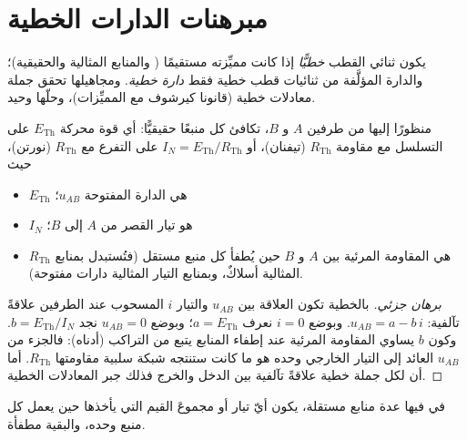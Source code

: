 \section{مبرهنات الدارات الخطية}

\begin{definition}\label{def:b1:dc-circuits:linear}
يكون ثنائي القطب \emph{خطيًّا} إذا كانت مميِّزته مستقيمًا
( والمنابع المثالية والحقيقية)؛ والدارة المؤلَّفة من ثنائيات قطب
خطية فقط \emph{دارة خطية}. ومجاهيلها تحقق جملة معادلات
خطية (قانونا كيرشوف مع المميِّزات)، وحلّها
وحيد.
\end{definition}

\begin{theorem}\label{thm:b1:dc-circuits:thevenin}
منظورًا إليها من طرفين $A$ و $B$، تكافئ كل 
منبعًا حقيقيًّا: أي قوة محركة $E_{\mathrm{Th}}$ على التسلسل مع
مقاومة $R_{\mathrm{Th}}$ (تيفنان)، أو  $I_N =
E_{\mathrm{Th}}/R_{\mathrm{Th}}$ على التفرع مع $R_{\mathrm{Th}}$
(نورتن)، حيث
\begin{itemize}
  \item $E_{\mathrm{Th}}$ هي  الدارة المفتوحة $u_{AB}$؛
  \item $I_N$ هو تيار القصر من $A$ إلى $B$؛
  \item $R_{\mathrm{Th}}$ هي المقاومة المرئية بين $A$ و $B$
        حين يُطفأ كل منبع مستقل (فتُستبدل بمنابع 
        المثالية أسلاكٌ، وبمنابع التيار المثالية دارات
        مفتوحة).
\end{itemize}
\end{theorem}

\begin{proof}[برهان جزئي]
بالخطية تكون العلاقة بين  $u_{AB}$ والتيار
$i$ المسحوب عند الطرفين علاقةً تآلفية: $u_{AB} = a - b\,i$. وبوضع
$i = 0$ نعرف $a = E_{\mathrm{Th}}$؛ وبوضع $u_{AB} = 0$ نجد
$b = E_{\mathrm{Th}}/I_N$. وكون $b$ يساوي المقاومة المرئية عند إطفاء
المنابع يتبع من التراكب (أدناه): فالجزء من $u_{AB}$
العائد إلى التيار الخارجي وحده هو ما كانت ستنتجه شبكة سلبية
مقاومتها $R_{\mathrm{Th}}$. أما أن لكل جملة خطية علاقةً
تآلفية بين الدخل والخرج فذلك جبر المعادلات الخطية.
\end{proof}

\begin{theorem}[التراكب]\label{thm:b1:dc-circuits:superposition}
في  فيها عدة منابع مستقلة، يكون أيّ تيار أو
 مجموعَ القيم التي يأخذها حين يعمل كل منبع وحده،
والبقية مطفأة.
\end{theorem}

